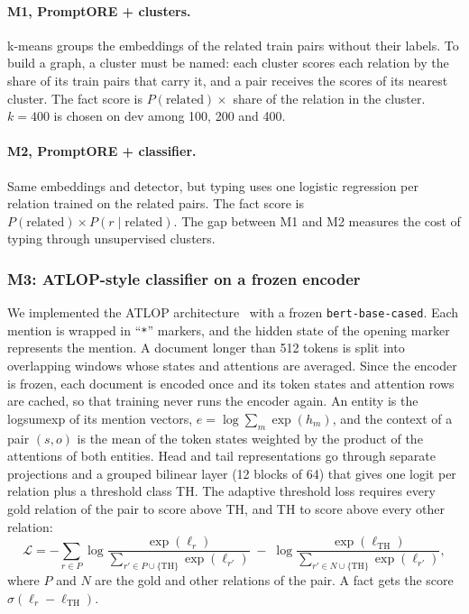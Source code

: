 \documentclass[pdflatex,sn-mathphys-num]{sn-jnl}
\begin{document}
\paragraph{M1, PromptORE + clusters.} k-means groups the embeddings of the related train pairs without their labels. To build a graph, a cluster must be named: each cluster scores each relation by the share of its train pairs that carry it, and a pair receives the scores of its nearest cluster. The fact score is $P(\text{related}) \times$ share of the relation in the cluster. $k=400$ is chosen on dev among 100, 200 and 400.

\paragraph{M2, PromptORE + classifier.} Same embeddings and detector, but typing uses one logistic regression per relation trained on the related pairs. The fact score is $P(\text{related}) \times P(r \mid \text{related})$. The gap between M1 and M2 measures the cost of typing through unsupervised clusters.

\subsubsection{M3: ATLOP-style classifier on a frozen encoder}\label{sec:atlop}

We implemented the ATLOP architecture~\cite{zhou2021atlop} with a frozen \texttt{bert-base-cased}. Each mention is wrapped in ``\texttt{*}'' markers, and the hidden state of the opening marker represents the mention. A document longer than 512 tokens is split into overlapping windows whose states and attentions are averaged. Since the encoder is frozen, each document is encoded once and its token states and attention rows are cached, so that training never runs the encoder again. An entity is the logsumexp of its mention vectors, $e = \log\sum_{m} \exp(h_m)$, and the context of a pair $(s,o)$ is the mean of the token states weighted by the product of the attentions of both entities. Head and tail representations go through separate projections and a grouped bilinear layer (12 blocks of 64) that gives one logit per relation plus a threshold class TH. The adaptive threshold loss requires every gold relation of the pair to score above TH, and TH to score above every other relation:
\begin{equation}
\mathcal{L} = -\sum_{r \in P} \log \frac{\exp(\ell_r)}{\sum_{r' \in P \cup \{\mathrm{TH}\}} \exp(\ell_{r'})} \; - \; \log \frac{\exp(\ell_{\mathrm{TH}})}{\sum_{r' \in N \cup \{\mathrm{TH}\}} \exp(\ell_{r'})},
\end{equation}
where $P$ and $N$ are the gold and other relations of the pair. A fact gets the score $\sigma(\ell_r - \ell_{\mathrm{TH}})$.
\end{document}
